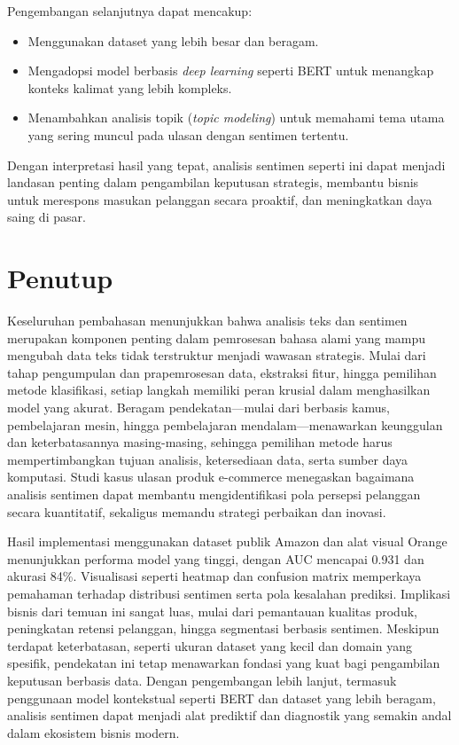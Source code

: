 Pengembangan selanjutnya dapat mencakup:
\begin{itemize}
	\item Menggunakan dataset yang lebih besar dan beragam.
	\item Mengadopsi model berbasis \textit{deep learning} seperti BERT untuk menangkap konteks kalimat yang lebih kompleks.
	\item Menambahkan analisis topik (\textit{topic modeling}) untuk memahami tema utama yang sering muncul pada ulasan dengan sentimen tertentu.
\end{itemize}

Dengan interpretasi hasil yang tepat, analisis sentimen seperti ini dapat menjadi landasan penting dalam pengambilan keputusan strategis, membantu bisnis untuk merespons masukan pelanggan secara proaktif, dan meningkatkan daya saing di pasar.


\section{Penutup}
Keseluruhan pembahasan menunjukkan bahwa analisis teks dan sentimen merupakan komponen penting dalam pemrosesan bahasa alami yang mampu mengubah data teks tidak terstruktur menjadi wawasan strategis. Mulai dari tahap pengumpulan dan prapemrosesan data, ekstraksi fitur, hingga pemilihan metode klasifikasi, setiap langkah memiliki peran krusial dalam menghasilkan model yang akurat. Beragam pendekatan—mulai dari berbasis kamus, pembelajaran mesin, hingga pembelajaran mendalam—menawarkan keunggulan dan keterbatasannya masing-masing, sehingga pemilihan metode harus mempertimbangkan tujuan analisis, ketersediaan data, serta sumber daya komputasi. Studi kasus ulasan produk e-commerce menegaskan bagaimana analisis sentimen dapat membantu mengidentifikasi pola persepsi pelanggan secara kuantitatif, sekaligus memandu strategi perbaikan dan inovasi.

Hasil implementasi menggunakan dataset publik Amazon dan alat visual Orange menunjukkan performa model yang tinggi, dengan AUC mencapai 0.931 dan akurasi 84\%. Visualisasi seperti heatmap dan confusion matrix memperkaya pemahaman terhadap distribusi sentimen serta pola kesalahan prediksi. Implikasi bisnis dari temuan ini sangat luas, mulai dari pemantauan kualitas produk, peningkatan retensi pelanggan, hingga segmentasi berbasis sentimen. Meskipun terdapat keterbatasan, seperti ukuran dataset yang kecil dan domain yang spesifik, pendekatan ini tetap menawarkan fondasi yang kuat bagi pengambilan keputusan berbasis data. Dengan pengembangan lebih lanjut, termasuk penggunaan model kontekstual seperti BERT dan dataset yang lebih beragam, analisis sentimen dapat menjadi alat prediktif dan diagnostik yang semakin andal dalam ekosistem bisnis modern.